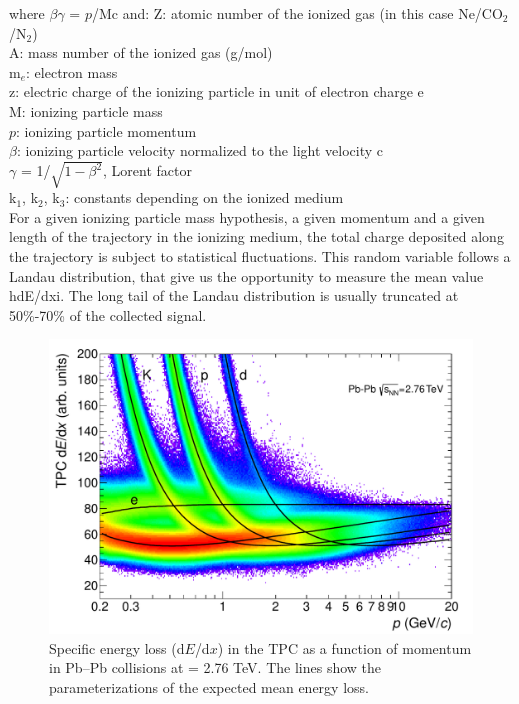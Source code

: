 where $\beta\gamma$ = $\ensuremath{p}$/Mc and:
Z: atomic number of the ionized gas (in this case Ne/CO$_{2}$/N$_{2}$)\\
A: mass number of the ionized gas (g/mol)\\
m$_{e}$: electron mass\\
z: electric charge of the ionizing particle in unit of electron charge e\\
M: ionizing particle mass\\
$\ensuremath{p}$: ionizing particle momentum\\
$\beta$: ionizing particle velocity normalized to the light velocity c\\
$\gamma$ = 1/$\sqrt{1-\beta^{2}}$, Lorent factor\\
k$_{1}$, k$_{2}$, k$_{3}$: constants depending on the ionized medium\\ 


For a given ionizing particle mass hypothesis, a given momentum and a given length of the trajectory in the ionizing medium, the total charge deposited along the trajectory is subject to statistical fluctuations. This random variable follows a Landau distribution, that give us the opportunity to measure the mean value hdE/dxi. The long tail of the Landau distribution is usually truncated at 50\%-70\% of the collected signal. 

\begin{figure}[htbp]
\begin{center}
\includegraphics[width=10.cm]{./Version1/FigChapter4/TPCPID}
\caption{Specific energy loss (d$E$/d$x$) in the TPC as a function of momentum in Pb--Pb collisions at \snn= 2.76 TeV. The lines show the parameterizations of the expected mean energy loss.}
\label{fig:tpcpidPbPb}
\end{center}
\end{figure}

